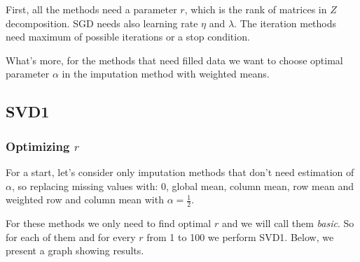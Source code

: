 \documentclass[10pt]{amsart}
\begin{document}
First, all the methods need a parameter $r$, which is the rank of matrices in $Z$ decomposition.
SGD needs also learning rate $\eta$ and $\lambda$.
The iteration methods need maximum of possible iterations or a stop condition.

What's more, for the methods that need filled data we want to choose optimal parameter $\alpha$ in the imputation method with weighted means.



\subsection*{SVD1}
\subsubsection*{Optimizing $r$}
For a start, let's consider only imputation methods that don't need estimation of $\alpha$, so replacing missing values with: 0, global mean, column mean, row mean and weighted row and column mean with $\alpha = \frac{1}{2}$.

For these methods we only need to find optimal $r$ and we will call them \textit{basic}.
So for each of them and for every $r$ from 1 to 100 we perform SVD1.
Below, we present a graph showing results.
\end{document}
